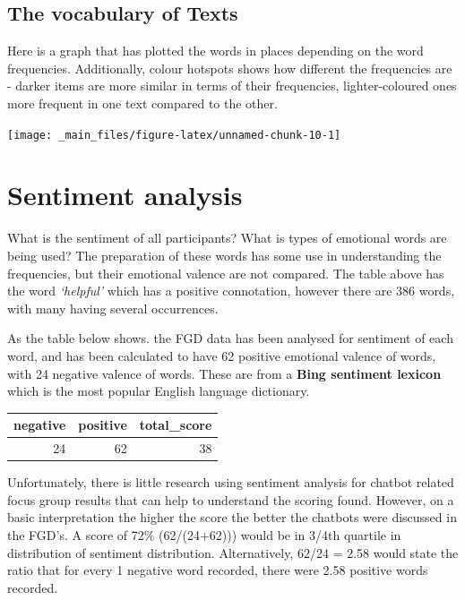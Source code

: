\documentclass[a4paper, nobind]{templates/ociamthesis}
\begin{document}
\hypertarget{the-vocabulary-of-texts}{%
\subsection{The vocabulary of Texts}\label{the-vocabulary-of-texts}}

Here is a graph that has plotted the words in places depending on the
word frequencies. Additionally, colour hotspots shows how different the
frequencies are - darker items are more similar in terms of their
frequencies, lighter-coloured ones more frequent in one text compared to
the other.

\begin{flushleft}\texttt{[image: \_main\_files/figure-latex/unnamed-chunk-10-1]} \end{flushleft}

\hypertarget{sentiment-analysis}{%
\section{Sentiment analysis}\label{sentiment-analysis}}

What is the sentiment of all participants? What is types of emotional
words are being used? The preparation of these words has some use in
understanding the frequencies, but their emotional valence are not
compared. The table above has the word \emph{`helpful'} which has a positive
connotation, however there are 386 words, with many having several
occurrences.

As the table below shows. the FGD data has been analysed for sentiment
of each word, and has been calculated to have 62 positive emotional
valence of words, with 24 negative valence of words. These are from a
\textbf{Bing sentiment lexicon} which is the most popular English language
dictionary.

\begin{tabular}{r|r|r}
\hline
negative & positive & total\_score\\
\hline
24 & 62 & 38\\
\hline
\end{tabular}

Unfortunately, there is little research using sentiment analysis for
chatbot related focus group results that can help to understand the
scoring found. However, on a basic interpretation the higher the score
the better the chatbots were discussed in the FGD's. A score of 72\%
(62/(24+62))) would be in 3/4th quartile in distribution of sentiment
distribution. Alternatively, 62/24 = 2.58 would state the ratio that for
every 1 negative word recorded, there were 2.58 positive words recorded.
\end{document}
